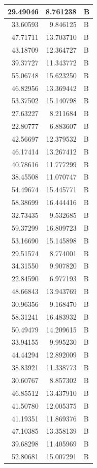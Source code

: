 \documentclass[
  letterpaper,
  DIV=11,
  numbers=noendperiod]{scrartcl}
\begin{document}
\begin{table}
\begin{tabular}[t]{r|r|l}
\hline
29.49046 & 8.761238 & B\\
\hline
33.60593 & 9.846125 & B\\
\hline
47.71711 & 13.703710 & B\\
\hline
43.18709 & 12.364727 & B\\
\hline
39.37727 & 11.343772 & B\\
\hline
55.06748 & 15.623250 & B\\
\hline
46.82956 & 13.369442 & B\\
\hline
53.37502 & 15.140798 & B\\
\hline
27.63227 & 8.211684 & B\\
\hline
22.80777 & 6.883607 & B\\
\hline
42.56697 & 12.379532 & B\\
\hline
46.17414 & 13.267412 & B\\
\hline
40.78616 & 11.777299 & B\\
\hline
38.45508 & 11.070747 & B\\
\hline
54.49674 & 15.445771 & B\\
\hline
58.38699 & 16.444416 & B\\
\hline
32.73435 & 9.532685 & B\\
\hline
59.37299 & 16.809723 & B\\
\hline
53.16690 & 15.145898 & B\\
\hline
29.51574 & 8.774001 & B\\
\hline
34.31550 & 9.907820 & B\\
\hline
22.84590 & 6.977193 & B\\
\hline
48.66843 & 13.943769 & B\\
\hline
30.96356 & 9.168470 & B\\
\hline
58.31241 & 16.483932 & B\\
\hline
50.49479 & 14.209615 & B\\
\hline
33.94155 & 9.995230 & B\\
\hline
44.44294 & 12.892009 & B\\
\hline
38.83921 & 11.338773 & B\\
\hline
30.60767 & 8.857302 & B\\
\hline
46.85512 & 13.437910 & B\\
\hline
41.50780 & 12.005375 & B\\
\hline
41.19351 & 11.869376 & B\\
\hline
47.10385 & 13.358139 & B\\
\hline
39.68298 & 11.405969 & B\\
\hline
52.80681 & 15.007291 & B\\

\end{tabular}
\end{table}
\end{document}
